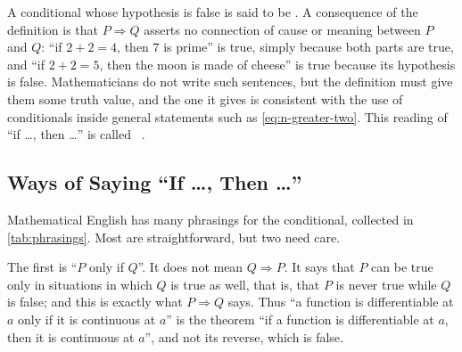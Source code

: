 A conditional whose hypothesis is false is said to be . A consequence of the definition is that $P\Rightarrow Q$ asserts no connection of cause or meaning between $P$ and $Q$: ``if $2+2=4$, then $7$ is prime'' is true, simply because both parts are true, and ``if $2+2=5$, then the moon is made of cheese'' is true because its hypothesis is false. Mathematicians do not write such sentences, but the definition must give them some truth value, and the one it gives is consistent with the use of conditionals inside general statements such as \eqref{eq:n-greater-two}. This reading of ``if \ldots, then \ldots'' is called ~\cite{enderton2001}.

\subsection{Ways of Saying ``If \ldots, Then \ldots''}

Mathematical English has many phrasings for the conditional, collected in \cref{tab:phrasings}. Most are straightforward, but two need care.

\begin{table}
\end{table}

The first is ``$P$ only if $Q$''. It does not mean $Q\Rightarrow P$. It says that $P$ can be true only in situations in which $Q$ is true as well, that is, that $P$ is never true while $Q$ is false; and this is exactly what $P\Rightarrow Q$ says. Thus ``a function is differentiable at $a$ only if it is continuous at $a$'' is the theorem ``if a function is differentiable at $a$, then it is continuous at $a$'', and not its reverse, which is false.

